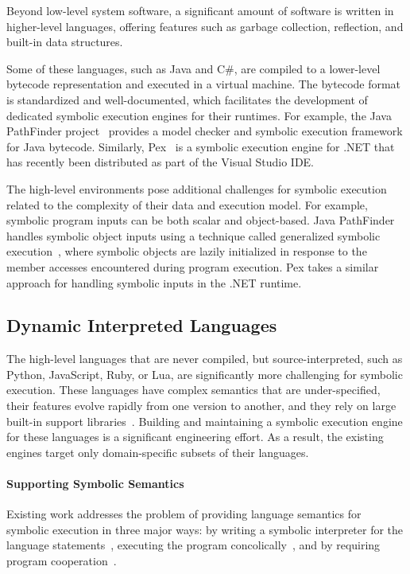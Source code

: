 Beyond low-level system software, a significant amount of software is written in higher-level languages, offering features such as garbage collection, reflection, and built-in data structures.

Some of these languages, such as Java and C\#, are compiled to a lower-level bytecode representation and executed in a virtual machine.
%
The bytecode format is standardized and well-documented, which facilitates the development of dedicated symbolic execution engines for their runtimes.
%
For example, the Java PathFinder project~\cite{visser-jpf,jpf-symbex,jpf-testgen} provides a model checker and symbolic execution framework for Java bytecode.
%
Similarly, Pex~\cite{tillmann-pex} is a symbolic execution engine for .NET that has recently been distributed as part of the Visual Studio IDE.

The high-level environments pose additional challenges for symbolic execution related to the complexity of their data and execution model.  For example, symbolic program inputs can be both scalar and object-based.
%
Java PathFinder handles symbolic object inputs using a technique called generalized symbolic execution~\cite{generalized-symbex}, where symbolic objects are lazily initialized in response to the member accesses encountered during program execution.  Pex takes a similar approach for handling symbolic inputs in the .NET runtime.

\subsection{Dynamic Interpreted Languages}

The high-level languages that are never compiled, but source-interpreted, such as Python, JavaScript, Ruby, or Lua, are significantly more challenging for symbolic execution.
%
These languages have complex semantics that are under-specified, their features evolve rapidly from one version to another, and they rely on large built-in support libraries~\cite{dom2011,cutie-py,pythonReference}.
%
Building and maintaining a symbolic execution engine for these languages is a significant engineering effort.  As a result, the existing engines target only domain-specific subsets of their languages.

\paragraph{Supporting Symbolic Semantics}

Existing work addresses the problem of providing language semantics for symbolic execution in three major ways: by writing a symbolic interpreter for the language statements~\cite{nice}, executing the program concolically~\cite{cutie-py,jalangi}, and by requiring program cooperation~\cite{commuter}.

